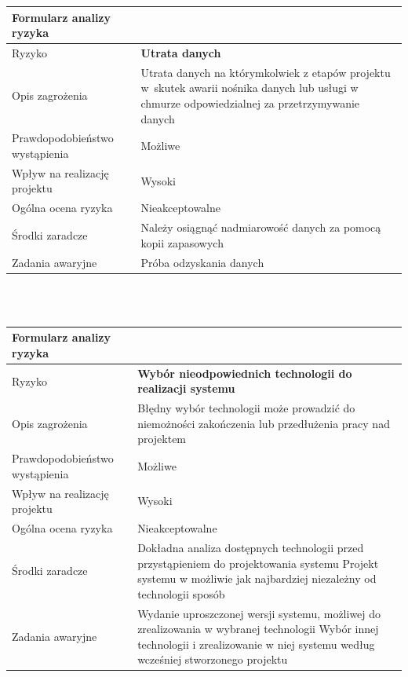 \documentclass{article}
\begin{document}
{\def\arraystretch{1.3}\tabcolsep=10pt
\begin{tabular}{|L{6cm}|L{9cm}|}
\hline
Formularz analizy ryzyka &  \\
\hline
Ryzyko 						   & \textbf{Utrata danych} \\
\hline
Opis zagrożenia				   & Utrata danych na którymkolwiek z etapów projektu w~skutek awarii nośnika danych lub usługi w chmurze odpowiedzialnej za przetrzymywanie danych \\
\hline
Prawdopodobieństwo wystąpienia & Możliwe \\
\hline
Wpływ na realizację projektu   & Wysoki \\
\hline
Ogólna ocena ryzyka   & Nieakceptowalne \\
\hline
Środki zaradcze				   & Należy osiągnąć nadmiarowość danych za pomocą kopii zapasowych     \\
\hline
Zadania awaryjne			   & Próba odzyskania danych \\
\hline
\end{tabular}}

\mbox{}\\\mbox{}\\

{\def\arraystretch{1.3}\tabcolsep=10pt
\begin{tabular}{|L{6cm}|L{9cm}|}
\hline
Formularz analizy ryzyka &  \\
\hline
Ryzyko 						   & \textbf{Wybór nieodpowiednich technologii do realizacji systemu} \\
\hline
Opis zagrożenia				   & Błędny wybór technologii może prowadzić do niemożności zakończenia lub przedłużenia pracy nad projektem \\
\hline
Prawdopodobieństwo wystąpienia & Możliwe \\
\hline
Wpływ na realizację projektu   & Wysoki \\
\hline
Ogólna ocena ryzyka   & Nieakceptowalne \\
\hline
Środki zaradcze				   & Dokładna analiza dostępnych technologii przed przystąpieniem do projektowania systemu
Projekt systemu w możliwie jak najbardziej niezależny od technologii sposób
 \\
\hline
Zadania awaryjne			   & Wydanie uproszczonej wersji systemu, możliwej do zrealizowania w wybranej technologii
Wybór innej technologii i zrealizowanie w niej systemu według wcześniej stworzonego projektu
 \\
\hline
\end{tabular}}
\end{document}
